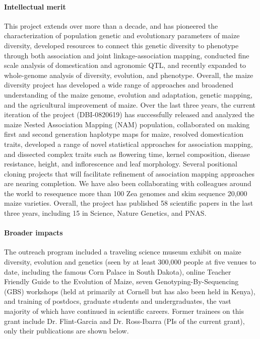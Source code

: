 \paragraph*{Intellectual merit}  This project extends over more than a decade, and has pioneered the characterization of population genetic and evolutionary parameters of maize diversity, developed resources to connect this genetic diversity to phenotype through both association and joint linkage-association mapping, conducted fine scale analysis of domestication and agronomic QTL, and recently expanded to whole-genome analysis of diversity, evolution, and phenotype. Overall, the maize diversity project has developed a wide range of approaches and broadened understanding of the maize genome, evolution and adaptation, genetic mapping, and the agricultural improvement of maize. Over the last three years, the current iteration of the project (DBI-0820619) has successfully released and analyzed the maize Nested Association Mapping (NAM) population, collaborated on making first and second generation haplotype maps for maize, resolved domestication traits, developed a range of novel statistical approaches for association mapping, and dissected complex traits such as flowering time, kernel composition, disease resistance, height, and inflorescence and leaf morphology. Several positional cloning projects that will facilitate refinement of association mapping approaches are nearing completion.  We have also been collaborating with colleagues around the world to resequence more than 100 Zea genomes and skim sequence 20,000 maize varieties. Overall, the project has published 58 scientific papers in the last three years, including 15 in Science, Nature Genetics, and PNAS. \\
\paragraph*{Broader impacts} The outreach program included a traveling science museum exhibit on maize diversity, evolution and genetics (seen by at least 300,000 people at five venues to date, including the famous Corn Palace in South Dakota), online Teacher Friendly Guide to the Evolution of Maize, seven Genotyping-By-Sequencing (GBS) workshops (held at primarily at Cornell but has also been held in Kenya), and training of postdocs, graduate students and undergraduates, the vast majority of which have continued in scientific careers.  Former trainees on this grant include Dr. Flint-Garcia  and Dr. Ross-Ibarra  (PIs of the current grant), only their publications are shown below.

